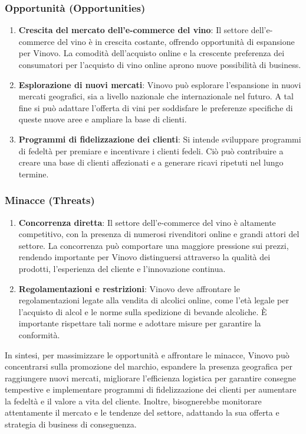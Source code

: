 \documentclass[12pt, a4paper]{article}
\begin{document}
\subsubsection*{Opportunità (Opportunities)}
\begin{enumerate}
    \item \textbf{Crescita del mercato dell'e-commerce del vino}: Il settore dell'e-commerce del vino è in crescita costante, offrendo opportunità di espansione per Vinovo. La comodità dell'acquisto online e la crescente preferenza dei consumatori per l'acquisto di vino online aprono nuove possibilità di business.
    \item \textbf{Esplorazione di nuovi mercati}: Vinovo può esplorare l'espansione in nuovi mercati geografici, sia a livello nazionale che internazionale nel futuro. A tal fine si può adattare l'offerta di vini per soddisfare le preferenze specifiche di queste nuove aree e ampliare la base di clienti.
    \item \textbf{Programmi di fidelizzazione dei clienti}: Si intende sviluppare programmi di fedeltà per premiare e incentivare i clienti fedeli. Ciò può contribuire a creare una base di clienti affezionati e a generare ricavi ripetuti nel lungo termine.
\end{enumerate}

\subsubsection*{Minacce (Threats)}
\begin{enumerate}
    \item \textbf{Concorrenza diretta}: Il settore dell'e-commerce del vino è altamente competitivo, con la presenza di numerosi rivenditori online e grandi attori del settore. La concorrenza può comportare una maggiore pressione sui prezzi, rendendo importante per Vinovo distinguersi attraverso la qualità dei prodotti, l'esperienza del cliente e l'innovazione continua.
    \item \textbf{Regolamentazioni e restrizioni}: Vinovo deve affrontare le regolamentazioni legate alla vendita di alcolici online, come l'età legale per l'acquisto di alcol e le norme sulla spedizione di bevande alcoliche. È importante rispettare tali norme e adottare misure per garantire la conformità.
\end{enumerate}\bigskip
In sintesi, per massimizzare le opportunità e affrontare le minacce, Vinovo può concentrarsi sulla promozione del marchio, espandere la presenza geografica per raggiungere nuovi mercati, migliorare l'efficienza logistica per garantire consegne tempestive e implementare programmi di fidelizzazione dei clienti per aumentare la fedeltà e il valore a vita del cliente. Inoltre, bisognerebbe monitorare attentamente il mercato e le tendenze del settore, adattando la sua offerta e strategia di business di conseguenza.
\newpage
\end{document}
